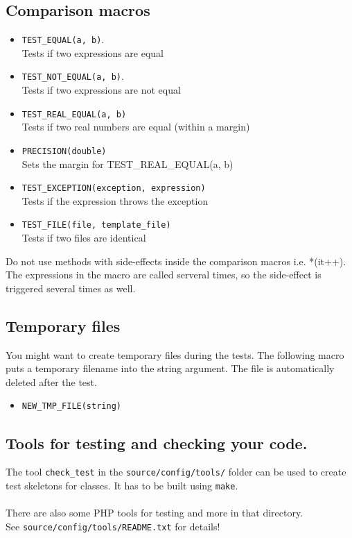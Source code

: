 \documentclass[a4]{article}
\begin{document}
\subsection{Comparison macros}
\begin{itemize}
        \item {\tt TEST\_EQUAL(a, b)}.\\ Tests if two expressions are equal
        \item {\tt TEST\_NOT\_EQUAL(a, b)}.\\ Tests if two expressions are not equal
        \item {\tt TEST\_REAL\_EQUAL(a, b)} \\ Tests if two real numbers are equal (within a margin)
        \item {\tt PRECISION(double)} \\ Sets the margin for TEST\_REAL\_EQUAL(a, b)
        \item {\tt TEST\_EXCEPTION(exception, expression)} \\ Tests if the expression throws the exception
        \item {\tt TEST\_FILE(file, template\_file)} \\ Tests if two files are identical
\end{itemize}
Do not use methods with side-effects inside the comparison macros i.e. *(it++). The expressions
in the macro are called serveral times, so the side-effect is triggered several times as well. 

\subsection{Temporary files}
You might want to create temporary files during the tests. The following macro 
puts a temporary filename into the string argument. The file is automatically deleted
after the test.
\begin{itemize}
        \item {\tt NEW\_TMP\_FILE(string)}
\end{itemize}

\subsection{Tools for testing and checking your code.}
The tool {\tt check\_test} in the {\tt source/config/tools/} folder can be used to
create test skeletons for classes. It has to be built using {\tt make}.\\
\\
There are also some PHP tools for testing and more in that directory.\\
See {\tt source/config/tools/README.txt} for details!
\end{document}
